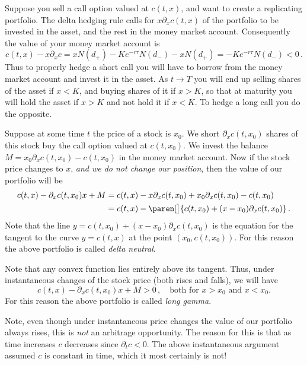 \begin{remark}
  Suppose you sell a call option valued at $c(t, x)$, and want to create a replicating portfolio.
  The delta hedging rule calls for $x \partial_x c(t, x)$ of the portfolio to be invested in the asset, and the rest in the money market account.
  Consequently the value of your money market account is
  \begin{equation*}
    c(t, x) - x \partial_x c
      = x N(d_+) - K e^{-r \tau} N(d_-) - x N(d_+)
      = - K e^{-r \tau} N(d_-) < 0\,.
  \end{equation*}
  Thus to properly hedge a short call you will have to borrow from the money market account and invest it in the asset.
  As $t \to T$ you will end up selling shares of the asset if $x < K$, and buying shares of it if $x > K$, so that at maturity you will hold the asset if $x > K$ and not hold it if $x < K$.
  To hedge a long call you do the opposite.
\end{remark}
\begin{remark}
  Suppose at some time $t$ the price of a stock is $x_0$.
  We short $\partial_x c(t, x_0)$ shares of this stock buy the call option valued at $c(t, x_0)$.
  We invest the balance $M = x_0 \partial_x c(t, x_0) - c(t, x_0)$ in the money market account.
  Now if the stock price changes to $x$, \emph{and we do not change our position}, then the value of our portfolio will be
  \begin{align*}
    c(t, x) - \partial_x c(t, x_0) x + M
      &= c(t, x) - x \partial_x c(t, x_0) + x_0 \partial_x c(t, x_0) - c(t, x_0)
    \\
      &= c(t, x) - \paren[\big]{c(t, x_0) + (x - x_0) \partial_x c(t, x_0) }\,.
  \end{align*}
  Note that the line $y = c(t, x_0) + (x - x_0) \partial_x c(t, x_0)$ is the equation for the tangent to the curve $y = c(t, x)$ at the point $(x_0, c(t, x_0))$.
  For this reason the above portfolio is called \emph{delta neutral}.

  Note that any convex function lies entirely above its tangent.
  Thus, under instantaneous changes of the stock price (both rises and falls), we will have
  \begin{equation*}
    c(t, x) - \partial_x c(t, x_0) x + M > 0\,,
    \quad\text{both for $x > x_0$ and $x < x_0$.}
  \end{equation*}
  For this reason the above portfolio is called \emph{long gamma}.

  Note, even though under instantaneous price changes the value of our portfolio always rises, this is \emph{not} an arbitrage opportunity.
  The reason for this is that as time increases $c$ decreases since $\partial_t c < 0$.
  The above instantaneous argument assumed $c$ is constant in time, which it most certainly is not!
\end{remark}
